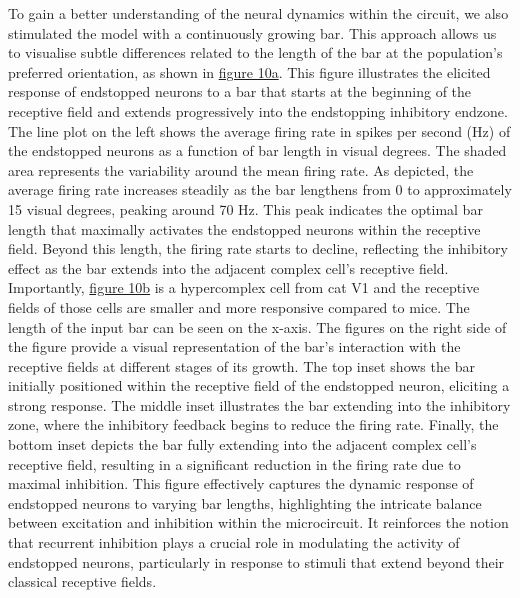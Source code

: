 \documentclass[12pt]{article}
\begin{document}
To gain a better understanding of the neural dynamics within the circuit, we also stimulated the model with a continuously growing bar. This approach allows us to visualise subtle differences related to the length of the bar at the population's preferred orientation, as shown in \hyperref[fig:endstopping_length]{figure 10a}. This figure illustrates the elicited response of endstopped neurons to a bar that starts at the beginning of the receptive field and extends progressively into the endstopping inhibitory endzone. The line plot on the left shows the average firing rate in spikes per second (Hz) of the endstopped neurons as a function of bar length in visual degrees. The shaded area represents the variability around the mean firing rate. As depicted, the average firing rate increases steadily as the bar lengthens from 0 to approximately 15 visual degrees, peaking around 70 Hz. This peak indicates the optimal bar length that maximally activates the endstopped neurons within the receptive field. Beyond this length, the firing rate starts to decline, reflecting the inhibitory effect as the bar extends into the adjacent complex cell's receptive field. Importantly, \hyperref[fig:endstopping_length]{figure 10b} is a hypercomplex cell from cat V1 and the receptive fields of those cells are smaller and more responsive compared to mice. The length of the input bar can be seen on the x-axis. The figures on the right side of the figure provide a visual representation of the bar's interaction with the receptive fields at different stages of its growth. The top inset shows the bar initially positioned within the receptive field of the endstopped neuron, eliciting a strong response. The middle inset illustrates the bar extending into the inhibitory zone, where the inhibitory feedback begins to reduce the firing rate. Finally, the bottom inset depicts the bar fully extending into the adjacent complex cell's receptive field, resulting in a significant reduction in the firing rate due to maximal inhibition. This figure effectively captures the dynamic response of endstopped neurons to varying bar lengths, highlighting the intricate balance between excitation and inhibition within the microcircuit. It reinforces the notion that recurrent inhibition plays a crucial role in modulating the activity of endstopped neurons, particularly in response to stimuli that extend beyond their classical receptive fields.
\end{document}
